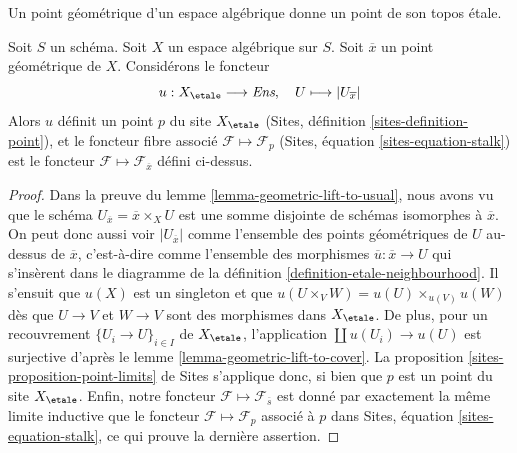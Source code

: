\begin{lemma}
\label{lemma-stalk-gives-point}
\begin{slogan}
Un point géométrique d'un espace algébrique donne un point de son topos \'etale.
\end{slogan}
Soit $S$ un schéma.
Soit $X$ un espace algébrique sur $S$.
Soit $\overline{x}$ un point géométrique de $X$.
Considérons le foncteur
$$
u : X_\etale \longrightarrow \textit{Ens}, \quad
U \longmapsto |U_{\overline{x}}|
$$
Alors $u$ définit un point $p$ du site $X_\etale$
(Sites, définition \ref{sites-definition-point}),
et le foncteur fibre associé $\mathcal{F} \mapsto \mathcal{F}_p$
(Sites, équation \ref{sites-equation-stalk})
est le foncteur $\mathcal{F} \mapsto \mathcal{F}_{\overline{x}}$
défini ci-dessus.
\end{lemma}

\begin{proof}
Dans la preuve du
lemme \ref{lemma-geometric-lift-to-usual},
nous avons vu que le schéma $U_{\overline{x}} = \overline{x} \times_X U$
est une somme disjointe de
schémas isomorphes à $\overline{x}$. On peut donc aussi voir
$|U_{\overline{x}}|$ comme l'ensemble des points géométriques de $U$
au-dessus de $\overline{x}$, c'est-à-dire comme l'ensemble des morphismes
$\overline{u} : \overline{x} \to U$ qui s'insèrent dans le diagramme de la
définition \ref{definition-etale-neighbourhood}.
Il s'ensuit que $u(X)$ est un singleton et que
$u(U \times_V W) = u(U) \times_{u(V)} u(W)$
dès que $U \to V$ et $W \to V$ sont des morphismes dans $X_\etale$.
De plus, pour un recouvrement $\{U_i \to U\}_{i \in I}$ de $X_\etale$,
l'application $\coprod u(U_i) \to u(U)$ est surjective d'après le
lemme \ref{lemma-geometric-lift-to-cover}.
La
proposition \ref{sites-proposition-point-limits} de Sites
s'applique donc, si bien que $p$ est un point du site $X_\etale$.
Enfin, notre foncteur $\mathcal{F} \mapsto \mathcal{F}_{\overline{s}}$
est donné par exactement la même limite inductive que le foncteur
$\mathcal{F} \mapsto \mathcal{F}_p$ associé à $p$ dans
Sites, équation \ref{sites-equation-stalk},
ce qui prouve la dernière assertion.
\end{proof}

